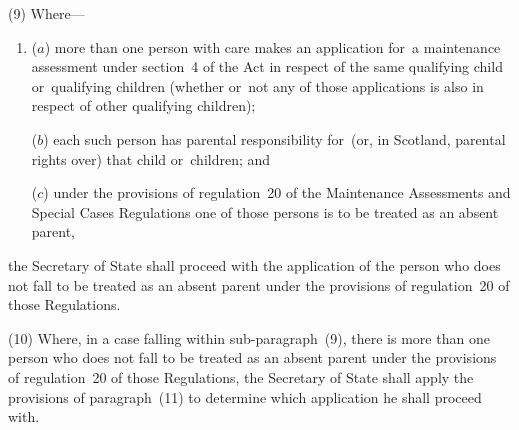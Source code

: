 \documentclass[a4paper,12pt]{article}
\begin{document}

(9) Where—
\begin{enumerate}\item[]
($a$) more than one person with care makes an application for~a maintenance assessment under section~4 of the Act in respect of the same qualifying child or~qualifying children (whether or~not any of those applications is also in respect of other qualifying children);

\begin{sloppypar}
($b$) each such person has parental responsibility for~(or, in Scotland, parental rights over) that child or~children; and
\end{sloppypar}

($c$) under the provisions of regulation~20 of the Maintenance Assessments and Special Cases Regulations one of those persons is to be treated as an absent parent,
\end{enumerate}
the Secretary of State  %
shall proceed with the application of the person who does not fall to be treated as an absent parent under the provisions of regulation~20 of those Regulations.

\begin{sloppypar}
(10) Where, in a case falling within sub-paragraph~(9), there is more than one person who does not fall to be treated as an absent parent under the provisions of regulation~20 of those Regulations, 
the Secretary of State  %
shall apply the provisions of paragraph~(11) to determine which application he shall proceed with.
\end{sloppypar}
\end{document}
